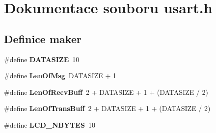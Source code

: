\section{Dokumentace souboru usart.h}
\label{usart_8h}
\subsection*{Definice maker}
\begin{DoxyCompactItemize}
\item 
\#define {\bf DATASIZE}~10
\item 
\#define {\bf LenOfMsg}~DATASIZE + 1
\item 
\#define {\bf LenOfRecvBuff}~2 + DATASIZE + 1 + (DATASIZE / 2)
\item 
\#define {\bf LenOfTransBuff}~2 + DATASIZE + 1 + (DATASIZE / 2)
\item 
\#define {\bf LCD\_\-NBYTES}~10
\end{DoxyCompactItemize}
